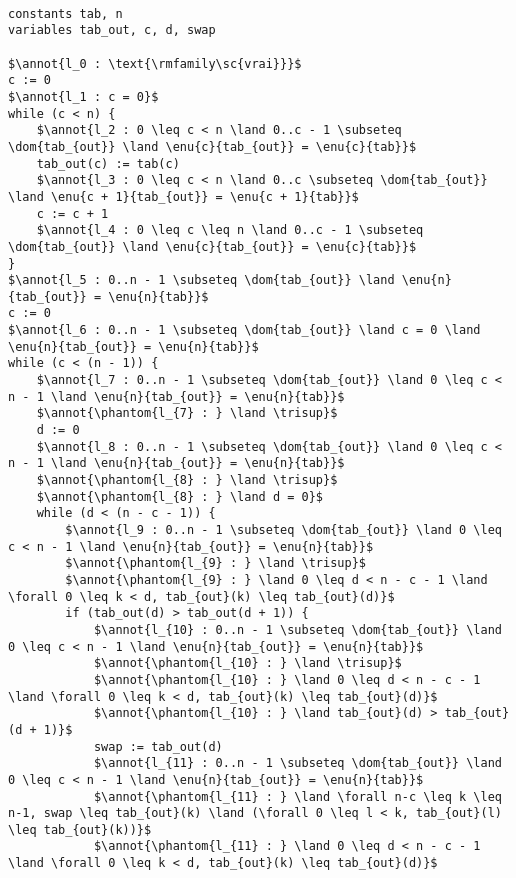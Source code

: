 \documentclass[a4paper, 11pt]{article}
\DeclareMathOperator{\eenu}{Enum}
\DeclareMathOperator{\ddom}{Dom}
\newcommand{\dom}[1]{\ddom\left(#1\right)}
\newcommand{\enu}[2]{\eenu_{\substack{#1}}\left(#2\right)}
\theoremstyle{mystyle}
\newcommand{\annot}[1]{{\color{black} #1}}
\begin{document}
\newcommand{\trisup}{\forall n-c \leq k \leq n-1, \forall 0 \leq l < k, tab_{out}(l) \leq tab_{out}(k)}
\begin{lstlisting}[language=prooflang, mathescape,
    basicstyle=\ttfamily\large\color{blue!90!black},
    keywordstyle=\bfseries,
    tabsize=4]
    
constants tab, n
variables tab_out, c, d, swap

$\annot{l_0 : \text{\rmfamily\sc{vrai}}}$
c := 0
$\annot{l_1 : c = 0}$
while (c < n) {
    $\annot{l_2 : 0 \leq c < n \land 0..c - 1 \subseteq \dom{tab_{out}} \land \enu{c}{tab_{out}} = \enu{c}{tab}}$
    tab_out(c) := tab(c)
    $\annot{l_3 : 0 \leq c < n \land 0..c \subseteq \dom{tab_{out}} \land \enu{c + 1}{tab_{out}} = \enu{c + 1}{tab}}$
    c := c + 1
    $\annot{l_4 : 0 \leq c \leq n \land 0..c - 1 \subseteq \dom{tab_{out}} \land \enu{c}{tab_{out}} = \enu{c}{tab}}$
}
$\annot{l_5 : 0..n - 1 \subseteq \dom{tab_{out}} \land \enu{n}{tab_{out}} = \enu{n}{tab}}$
c := 0
$\annot{l_6 : 0..n - 1 \subseteq \dom{tab_{out}} \land c = 0 \land \enu{n}{tab_{out}} = \enu{n}{tab}}$
while (c < (n - 1)) {
    $\annot{l_7 : 0..n - 1 \subseteq \dom{tab_{out}} \land 0 \leq c < n - 1 \land \enu{n}{tab_{out}} = \enu{n}{tab}}$
    $\annot{\phantom{l_{7} : } \land \trisup}$
    d := 0
    $\annot{l_8 : 0..n - 1 \subseteq \dom{tab_{out}} \land 0 \leq c < n - 1 \land \enu{n}{tab_{out}} = \enu{n}{tab}}$
    $\annot{\phantom{l_{8} : } \land \trisup}$
    $\annot{\phantom{l_{8} : } \land d = 0}$
    while (d < (n - c - 1)) {
        $\annot{l_9 : 0..n - 1 \subseteq \dom{tab_{out}} \land 0 \leq c < n - 1 \land \enu{n}{tab_{out}} = \enu{n}{tab}}$
        $\annot{\phantom{l_{9} : } \land \trisup}$
        $\annot{\phantom{l_{9} : } \land 0 \leq d < n - c - 1 \land \forall 0 \leq k < d, tab_{out}(k) \leq tab_{out}(d)}$
        if (tab_out(d) > tab_out(d + 1)) {
            $\annot{l_{10} : 0..n - 1 \subseteq \dom{tab_{out}} \land 0 \leq c < n - 1 \land \enu{n}{tab_{out}} = \enu{n}{tab}}$
            $\annot{\phantom{l_{10} : } \land \trisup}$
            $\annot{\phantom{l_{10} : } \land 0 \leq d < n - c - 1 \land \forall 0 \leq k < d, tab_{out}(k) \leq tab_{out}(d)}$
            $\annot{\phantom{l_{10} : } \land tab_{out}(d) > tab_{out}(d + 1)}$
            swap := tab_out(d)
            $\annot{l_{11} : 0..n - 1 \subseteq \dom{tab_{out}} \land 0 \leq c < n - 1 \land \enu{n}{tab_{out}} = \enu{n}{tab}}$
            $\annot{\phantom{l_{11} : } \land \forall n-c \leq k \leq n-1, swap \leq tab_{out}(k) \land (\forall 0 \leq l < k, tab_{out}(l) \leq tab_{out}(k))}$
            $\annot{\phantom{l_{11} : } \land 0 \leq d < n - c - 1 \land \forall 0 \leq k < d, tab_{out}(k) \leq tab_{out}(d)}$

\end{lstlisting}
\end{document}
